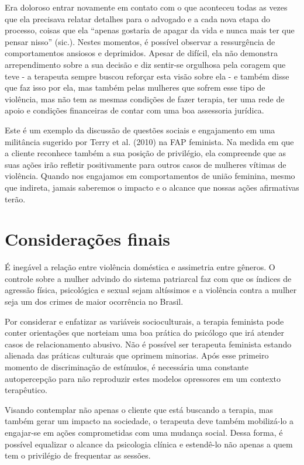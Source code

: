Era doloroso entrar novamente em contato com o que aconteceu todas as vezes que ela precisava relatar detalhes para o advogado e a cada nova etapa do processo, coisas que ela ``apenas gostaria de apagar da vida e nunca mais ter que pensar nisso'' (sic.). Nestes momentos, é possível observar a ressurgência de comportamentos ansiosos e deprimidos. Apesar de difícil, ela não demonstra arrependimento sobre a sua decisão e diz sentir-se orgulhosa pela coragem que teve - a terapeuta sempre buscou reforçar esta visão sobre ela - e também disse que faz isso por ela, mas também pelas mulheres que sofrem esse tipo de violência, mas não tem as mesmas condições de fazer terapia, ter uma rede de apoio e condições financeiras de contar com uma boa assessoria jurídica.

Este é um exemplo da discussão de questões sociais e engajamento em uma militância sugerido por Terry et al. (2010) na FAP feminista. Na medida em que a cliente reconhece também a sua posição de privilégio, ela compreende que as suas ações irão refletir positivamente para outros casos de mulheres vítimas de violência. Quando nos engajamos em comportamentos de união feminina, mesmo que indireta, jamais saberemos o impacto e o alcance que nossas ações afirmativas terão. 

\section{Considerações finais}

É inegável a relação entre violência doméstica e assimetria entre gêneros. O controle sobre a mulher advindo do sistema patriarcal faz com que os índices de agressão física, psicológica e sexual sejam altíssimos e a violência contra a mulher seja um dos crimes de maior ocorrência no Brasil.

Por considerar e enfatizar as variáveis socioculturais, a terapia feminista pode conter orientações que norteiam uma boa prática do psicólogo que irá atender casos de relacionamento abusivo. Não é possível ser terapeuta feminista estando alienada das práticas culturais que oprimem minorias. Após esse primeiro momento de discriminação de estímulos, é necessária uma constante autopercepção para não reproduzir estes modelos opressores em um contexto terapêutico.

Visando contemplar não apenas o cliente que está buscando a terapia, mas também gerar um impacto na sociedade, o terapeuta deve também mobilizá-lo a engajar-se em ações comprometidas com uma mudança social. Dessa forma, é possível equalizar o alcance da psicologia clínica e estendê-lo não apenas a quem tem o privilégio de frequentar as sessões.

